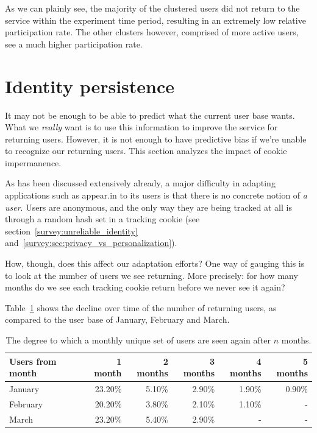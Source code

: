 As we can plainly see, the majority of the clustered users did not return to the service within the experiment time period, resulting in an extremely low relative participation rate.
The other clusters however, comprised of more active users, see a much higher participation rate.

\section{Identity persistence}
\label{eval:sec:identity_persistence}

It may not be enough to be able to predict what the current user base wants. What we \emph{really} want is to use this information to improve the service for returning users. However, it is not enough to have predictive bias if we're unable to recognize our returning users. This section analyzes the impact of cookie impermanence.

As has been discussed extensively already, a major difficulty in adapting applications such as appear.in to its users is that there is no concrete notion of \emph{a user}. Users are anonymous, and the only way they are being tracked at all is through a random hash set in a tracking cookie (see section~\ref{survey:unreliable_identity} and~\ref{survey:sec:privacy_vs_personalization}).

How, though, does this affect our adaptation efforts? One way of gauging this is to look at the number of users we see returning. More precisely: for how many months do we see each tracking cookie return before we never see it again?

Table~\ref{tab:returning_users} shows the decline over time of the number of returning users, as compared to the user base of January, February and March.

\begin{table}[h]
  \centering
  \begin{tabular}{|l|rrrrr|}
    \hline
    Users from month & 1 month & 2 months & 3 months & 4 months & 5 months \\ \hline
    January          & 23.20\% & 5.10\%   & 2.90\%   & 1.90\%   & 0.90\%   \\
    February         & 20.20\% & 3.80\%   & 2.10\%   & 1.10\%   & -        \\
    March            & 23.20\% & 5.40\%   & 2.90\%   & -        & -        \\ \hline
  \end{tabular}
  \caption{The degree to which a monthly unique set of users are seen again after $n$ months.}
  \label{tab:returning_users}
\end{table}

